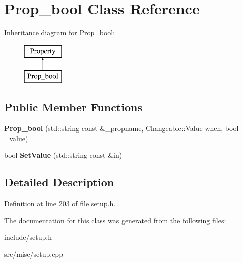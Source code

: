 \hypertarget{classProp__bool}{\section{Prop\-\_\-bool Class Reference}
\label{classProp__bool}
}
Inheritance diagram for Prop\-\_\-bool\-:\begin{figure}[H]
\begin{center}
\leavevmode
\includegraphics[height=2.000000cm]{classProp__bool}
\end{center}
\end{figure}
\subsection*{Public Member Functions}
\begin{DoxyCompactItemize}
\item 
\hypertarget{classProp__bool_ab70b5efc7550776962b20ecc1fd329ca}{{\bfseries Prop\-\_\-bool} (std\-::string const \&\-\_\-propname, Changeable\-::\-Value when, bool \-\_\-value)}\label{classProp__bool_ab70b5efc7550776962b20ecc1fd329ca}

\item 
\hypertarget{classProp__bool_aed3bf08dc9a6f2973d7e24cc6407796a}{bool {\bfseries Set\-Value} (std\-::string const \&in)}\label{classProp__bool_aed3bf08dc9a6f2973d7e24cc6407796a}

\end{DoxyCompactItemize}


\subsection{Detailed Description}


Definition at line 203 of file setup.\-h.



The documentation for this class was generated from the following files\-:\begin{DoxyCompactItemize}
\item 
include/setup.\-h\item 
src/misc/setup.\-cpp\end{DoxyCompactItemize}

